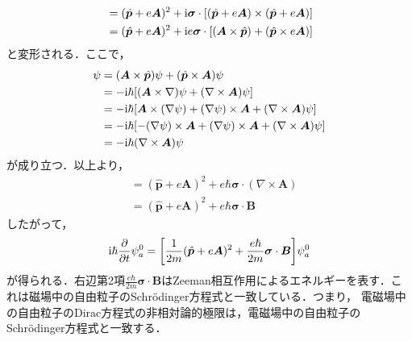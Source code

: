 \documentclass{report}
\begin{document}
\begin{align}
  [\bm{\sigma}\cdot(\bm{p} + e\bm{A})][\bm{\sigma}\cdot(\bm{p} + e\bm{A})] &= (\hat{\bm{p}} + e\bm{A})^2 + \i \bm{\sigma} \cdot [(\hat{\bm{p}} + e\bm{A}) \times (\hat{\bm{p}} + e\bm{A})]\\
  &= (\hat{\bm{p}} + e\bm{A})^2 + \i e \bm{\sigma} \cdot [(\bm{A} \times \hat{\bm{p}}) + (\hat{\bm{p}} \times e\bm{A})]\\
\end{align}
と変形される．ここで，
\begin{align}
  [(\bm{A} \times \hat{\bm{p}}) + (\hat{\bm{p}} \times e\bm{A})]\psi &= (\bm{A} \times \hat{\bm{p}})\psi + (\hat{\bm{p}} \times \bm{A})\psi\\
  &= -\i \hbar \qty[(\bm{A} \times \nabla) \psi + (\nabla \times \bm{A}) \psi]\\
  &= -\i\hbar \qty[\bm{A} \times (\nabla \psi) + (\nabla\psi)\times \bm{A} + (\nabla \times \bm{A}) \psi]\\
  &= -\i\hbar \qty[-(\nabla\psi)\times \bm{A} + (\nabla\psi)\times \bm{A} + (\nabla \times \bm{A}) \psi]\\
  &= -\i\hbar(\nabla \times \bm{A}) \psi
\end{align}
が成り立つ．以上より，
\begin{align}
  [\bm{\sigma}\cdot(\bm{p} + e\bm{A})][\bm{\sigma}\cdot(\bm{p} + e\bm{A})] &= (\hat{\bm{p}} + e\bm{A})^2 + e\hbar \bm{\sigma}\cdot(\nabla \times \bm{A})\\
  &= (\hat{\bm{p}} + e\bm{A})^2 + e\hbar \bm{\sigma} \cdot \bm{B}
\end{align}
したがって，
\begin{align}
  \mathrm{i}\hbar \frac{\partial}{\partial t} \psi_a^0 = \qty[\frac{1}{2m} (\hat{\bm{p}} + e\bm{A})^2 + \frac{e\hbar}{2m}\bm{\sigma}\cdot\bm{B}] \psi_a^0
\end{align}
が得られる．右辺第2項$\frac{e\hbar}{2m}\bm{\sigma}\cdot\bm{B}$はZeeman相互作用によるエネルギーを表す．これは磁場中の自由粒子のSchrödinger方程式と一致している．つまり，
電磁場中の自由粒子のDirac方程式の非相対論的極限は，電磁場中の自由粒子のSchrödinger方程式と一致する．
\end{document}
